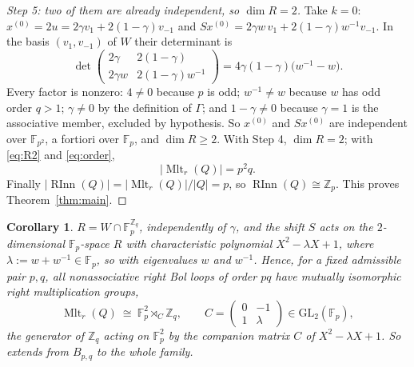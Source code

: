\documentclass[11pt]{amsart}
\newtheorem{corollary}[theorem]{Corollary}
\theoremstyle{definition}
\newcommand{\Mltr}{\operatorname{Mlt}_r}
\newcommand{\RInn}{\operatorname{RInn}}
\newcommand{\FF}[1]{\mathbb F_{#1}}
\newcommand{\Zq}{\mathbb Z_q}
\begin{document}
\begin{proof}[Step 5: two of them are already independent, so $\dim R=2$]
Take $k=0$: $x^{(0)}=2u=2\gamma v_1+2(1-\gamma)v_{-1}$ and
$Sx^{(0)}=2\gamma w\,v_1+2(1-\gamma)w^{-1}v_{-1}$. In the basis
$(v_1,v_{-1})$ of $W$ their determinant is
\begin{equation}\label{eq:det}
  \det\begin{pmatrix}2\gamma & 2(1-\gamma)\\[2pt]
                      2\gamma w & 2(1-\gamma)w^{-1}\end{pmatrix}
  =4\gamma(1-\gamma)\bigl(w^{-1}-w\bigr).
\end{equation}
Every factor is nonzero: $4\neq0$ because $p$ is odd; $w^{-1}\neq w$ because
$w$ has odd order $q>1$; $\gamma\neq0$ by the definition of $\Gamma$; and
$1-\gamma\neq0$ because $\gamma=1$ is the associative member, excluded by
hypothesis. So $x^{(0)}$ and $Sx^{(0)}$ are independent over $\FF{p^{2}}$, a
fortiori over $\FF p$, and $\dim R\ge2$. With Step 4, $\dim R=2$; with
\eqref{eq:R2} and \eqref{eq:order},
\[
  |\Mltr(Q)|=p^{2}q .
\]
Finally $|\RInn(Q)|=|\Mltr(Q)|/|Q|=p$, so $\RInn(Q)\cong\mathbb Z_p$. This
proves Theorem~\ref{thm:main}.
\end{proof}

\begin{corollary}\label{cor:iso}
$R=W\cap\FF p^{\Zq}$, independently of $\gamma$, and the shift $S$ acts on the
$2$-dimensional $\FF p$-space $R$ with characteristic polynomial
$X^{2}-\lambda X+1$, where $\lambda:=w+w^{-1}\in\FF p$, so with eigenvalues $w$
and $w^{-1}$. Hence, for a fixed admissible pair $p,q$, all nonassociative
right Bol loops of order $pq$ have mutually isomorphic right multiplication
groups,
\[
  \Mltr(Q)\ \cong\ \FF p^{2}\rtimes_{C}\Zq ,
  \qquad
  C=\begin{pmatrix}0&-1\\1&\lambda\end{pmatrix}\in\mathrm{GL}_2(\FF p),
\]
the generator of $\Zq$ acting on $\FF p^{2}$ by the companion matrix $C$ of
$X^{2}-\lambda X+1$. So \cite[Theorem~1.1(v)]{KNV} extends from $B_{p,q}$ to
the whole family.
\end{corollary}
\end{document}

